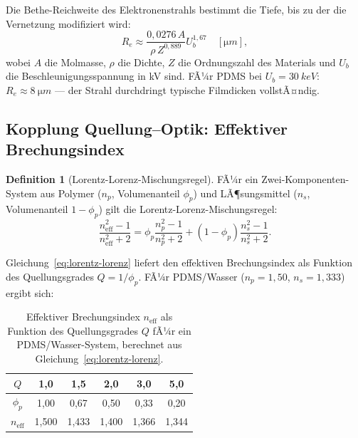 ﻿\documentclass[a4paper,12pt]{article}
\theoremstyle{definition}
\newtheorem{definition}{Definition}[section]
\newcommand{\neff}{n_\mathrm{eff}}
\begin{document}
	Die Bethe-Reichweite des Elektronenstrahls bestimmt die Tiefe, bis zu der
	die Vernetzung modifiziert wird:
	\begin{equation}
		R_e \approx \frac{0{,}0276\, A}{\rho\, Z^{0{,}889}} U_b^{1{,}67} \quad [\si{\micro m}],
		\label{eq:bethe-reichweite}
	\end{equation}
	wobei $A$ die Molmasse, $\rho$ die Dichte, $Z$ die Ordnungszahl des Materials
	und $U_b$ die Beschleunigungsspannung in kV sind.
	FÃ¼r PDMS bei $U_b = \SI{30}{keV}$: $R_e \approx \SI{8}{\micro m}$ ---
	der Strahl durchdringt typische Filmdicken vollstÃ¤ndig.
	
	\subsection{Kopplung Quellung--Optik: Effektiver Brechungsindex}
	\label{ssec:kopplungsgleichung}
	
	\begin{definition}[Lorentz-Lorenz-Mischungsregel]
		\label{def:lorentz-lorenz}
		FÃ¼r ein Zwei-Komponenten-System aus Polymer ($n_p$, Volumenanteil $\phi_p$)
		und LÃ¶sungsmittel ($n_s$, Volumenanteil $1-\phi_p$) gilt die
		Lorentz-Lorenz-Mischungsregel:
		\begin{equation}
			\frac{\neff^2 - 1}{\neff^2 + 2} = \phi_p \frac{n_p^2-1}{n_p^2+2}
			+ (1-\phi_p)\frac{n_s^2-1}{n_s^2+2}.
			\label{eq:lorentz-lorenz}
		\end{equation}
	\end{definition}
	
	Gleichung~\eqref{eq:lorentz-lorenz} liefert den effektiven Brechungsindex
	als Funktion des Quellungsgrades $Q = 1/\phi_p$. FÃ¼r PDMS/Wasser
	($n_p = 1{,}50$, $n_s = 1{,}333$) ergibt sich:
	
	\begin{table}[htb]
		\centering
		\caption{Effektiver Brechungsindex $\neff$ als Funktion des Quellungsgrades
			$Q$ fÃ¼r ein PDMS/Wasser-System, berechnet aus Gleichung~\eqref{eq:lorentz-lorenz}.}
		\label{tab:neff}
		\begin{tabular}{cccccc}
			\toprule
			$Q$ & 1{,}0 & 1{,}5 & 2{,}0 & 3{,}0 & 5{,}0 \\
			\midrule
			$\phi_p$ & 1{,}00 & 0{,}67 & 0{,}50 & 0{,}33 & 0{,}20 \\
			$\neff$ & 1{,}500 & 1{,}433 & 1{,}400 & 1{,}366 & 1{,}344 \\
			\bottomrule
		\end{tabular}
	\end{table}
	
\end{document}
